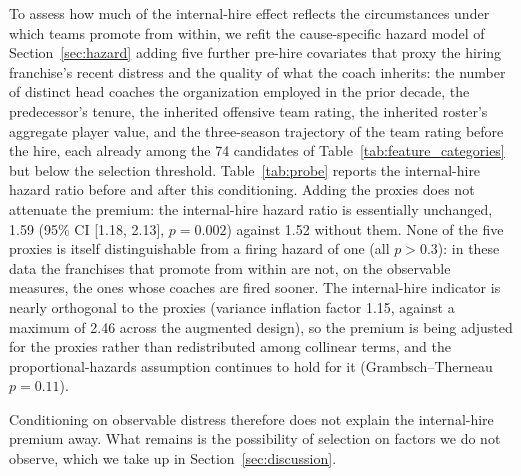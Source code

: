 \documentclass[12pt,USenglish]{article}
\begin{document}
To assess how much of the internal-hire effect reflects the circumstances under which teams promote from within, we refit the cause-specific hazard model of Section~\ref{sec:hazard} adding five further pre-hire covariates that proxy the hiring franchise's recent distress and the quality of what the coach inherits: the number of distinct head coaches the organization employed in the prior decade, the predecessor's tenure, the inherited offensive team rating, the inherited roster's aggregate player value, and the three-season trajectory of the team rating before the hire, each already among the 74 candidates of Table~\ref{tab:feature_categories} but below the selection threshold. Table~\ref{tab:probe} reports the internal-hire hazard ratio before and after this conditioning. Adding the proxies does not attenuate the premium: the internal-hire hazard ratio is essentially unchanged, 1.59 (95\% CI [1.18, 2.13], $p = 0.002$) against 1.52 without them. None of the five proxies is itself distinguishable from a firing hazard of one (all $p > 0.3$): in these data the franchises that promote from within are not, on the observable measures, the ones whose coaches are fired sooner. The internal-hire indicator is nearly orthogonal to the proxies (variance inflation factor 1.15, against a maximum of 2.46 across the augmented design), so the premium is being adjusted for the proxies rather than redistributed among collinear terms, and the proportional-hazards assumption continues to hold for it (Grambsch--Therneau $p = 0.11$).

Conditioning on observable distress therefore does not explain the internal-hire premium away. What remains is the possibility of selection on factors we do not observe, which we take up in Section~\ref{sec:discussion}.
\end{document}
